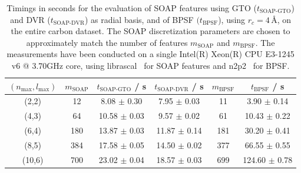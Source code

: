 \begin{table}[bthp]
\centering
\begin{tabular}{c|c|c|c||c|c}
\hline\hline
    $(n_\text{max},l_\text{max})$ & $m_\text{SOAP}$ & $t_\text{SOAP-GTO}$ / s&  $t_\text{SOAP-DVR}$ / s & $m_\text{BPSF}$ & $t_\text{BPSF}$ / s\\
    \hline
    (2,2) &  12 &  8.08 $\pm$ 0.30 &  7.95 $\pm$ 0.03 &  11 &   3.90 $\pm$ 0.14 \\ 
    (4,3) &  64 & 10.58 $\pm$ 0.03 &  9.57 $\pm$ 0.02 &  61 &  10.43 $\pm$ 0.22 \\
    (6,4) & 180 & 13.87 $\pm$ 0.03 & 11.87 $\pm$ 0.14 & 181 &  30.20 $\pm$ 0.41 \\
    (8,5) & 384 & 17.58 $\pm$ 0.05 & 14.50 $\pm$ 0.02 & 377 &  66.55 $\pm$ 0.55 \\
   (10,6) & 700 & 23.02 $\pm$ 0.04 & 18.57 $\pm$ 0.03 & 699 & 124.60 $\pm$ 0.78 \\
  \hline\hline
\end{tabular}
\caption{Timings in seconds for the evaluation of SOAP features using GTO ($t_\text{SOAP-GTO}$) and DVR ($t_\text{SOAP-DVR}$) as radial basis, and of BPSF $(t_\text{BPSF}$), using $r_c=4$\,\AA{}, on the entire carbon dataset. The SOAP discretization parameters are chosen to approximately match the number of features $m_\text{SOAP}$ and $m_\text{BPSF}$. 
The measurements have been conducted on a single  Intel(R) Xeon(R) CPU E3-1245 v6 @ 3.70GHz core, using librascal~\cite{LIBRASCAL} for SOAP features and n2p2~\cite{N2P2} for BPSF.}
\label{table:timings}
\end{table}



